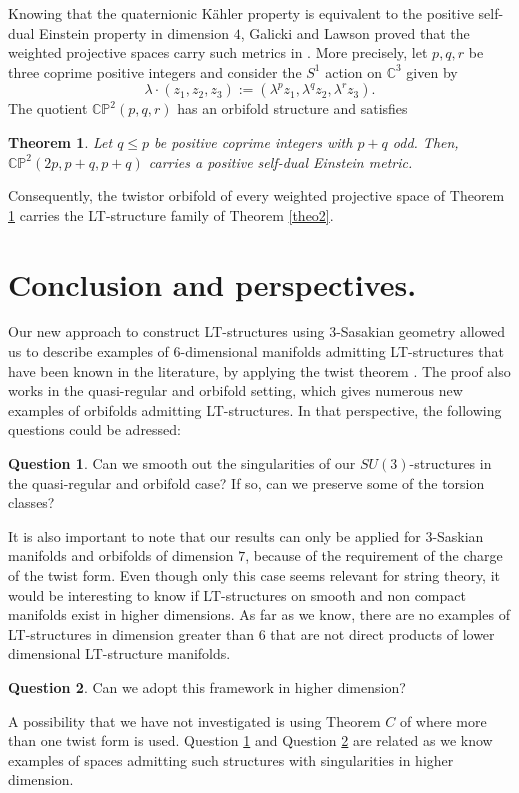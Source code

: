 \documentclass[12pt, reqno]{amsart}
\newtheorem{theo}[Def]{Theorem}
\theoremstyle{definition}
\newtheorem{quest}{Question}
\newcommand{\C}{\mathbb{C}}
\newcommand{\p}{\mathbb{P}}
\begin{document}
Knowing that the quaternionic Kähler property is equivalent to the positive self-dual Einstein property in dimension $4$, Galicki and Lawson proved that the weighted projective spaces carry such metrics in \cite{Galicki1988}. More precisely, let $p,q,r$ be three coprime positive integers and consider the $S^1$ action on $\C^3$ given by $$\lambda\cdot(z_1,z_2,z_3):=(\lambda^pz_1,\lambda^qz_2,\lambda^rz_3).$$ The quotient $\C\p^2(p,q,r)$ has an orbifold structure and satisfies
\begin{theo}\label{weigthedprojectivespace}\cite[Theorem 4.26]{Galicki1988} Let $q\leq p$ be positive coprime integers with $p+q$ odd. Then, $\C\p^2(2p,p+q,p+q)$ carries a positive self-dual Einstein metric.
\end{theo}
Consequently, the twistor orbifold of every weighted projective space  of Theorem \ref{weigthedprojectivespace} carries the LT-structure family of Theorem \ref{theo2}.
\section{Conclusion and perspectives.} Our new approach to construct LT-structures using $3$-Sasakian geometry allowed us to describe examples of $6$-dimensional manifolds admitting LT-structures that have been known in the literature, by applying the twist theorem \cite{peres2026sunstructuresquotienttorusactions}. The proof also works in the quasi-regular and orbifold setting, which gives numerous new examples of orbifolds admitting LT-structures. In that perspective, the following questions could be adressed: 
\begin{quest}\label{quest1}
    Can we smooth out the singularities of our $SU(3)$-structures in the quasi-regular and orbifold case? If so, can we preserve some of the torsion classes? 
\end{quest}
 It is also important to note that our results can only be applied for $3$-Saskian manifolds and orbifolds of dimension $7$, because of the requirement of the charge of the twist form. Even though only this case seems relevant for string theory, it would be interesting to know if LT-structures on smooth and non compact manifolds exist in higher dimensions. As far as we know, there are no examples of LT-structures in dimension greater than $6$ that are not direct products of lower dimensional LT-structure manifolds.
 \begin{quest}\label{quest2}
     Can we adopt this framework in higher dimension?
 \end{quest}
A possibility that we have not investigated is using Theorem $C$ of \cite{peres2026sunstructuresquotienttorusactions} where more than one twist form is used. Question \ref{quest1} and Question \ref{quest2} are related as we know examples of spaces admitting such structures with singularities in higher dimension.  



\printbibliography[title=References]
\end{document}
